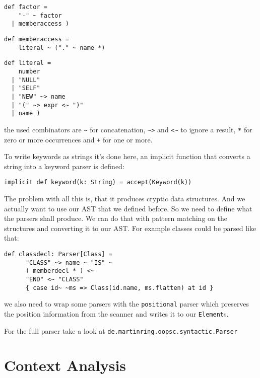 \documentclass{style}
\begin{document}
\begin{lstlisting}[name=parser]
def factor = 
    "-" ~ factor                                        
  | memberaccess )
\end{lstlisting}
\begin{lstlisting}[name=parser]
def memberaccess =
    literal ~ ("." ~ name *)                            
\end{lstlisting}
\begin{lstlisting}[name=parser]
def literal = 
    number                                              
  | "NULL"                                              
  | "SELF"                                              
  | "NEW" ~> name                                       
  | "(" ~> expr <~ ")"
  | name ) 
\end{lstlisting}

the used combinators are \texttt{\textasciitilde} for concatenation, \texttt{\textasciitilde >} and \texttt{<\textasciitilde} to ignore a result, \texttt{*} for zero or more occurrences and \texttt{+} for one or more.

To write keywords as strings it's done here, an implicit function that converts a string into a keyword parser is defined:

\begin{lstlisting}[name=parser]
implicit def keyword(k: String) = accept(Keyword(k))
\end{lstlisting}

The problem with all this is, that it produces cryptic data structures. And we actually want to use our AST that we defined before. So we need to define what the parsers shall produce. We can do that with pattern matching on the structures and converting it to our AST. For example classes could be parsed like that:

\begin{lstlisting}[name=parser]
  def classdecl: Parser[Class] =
      "CLASS" ~> name ~ "IS" ~
      ( memberdecl * ) <~
      "END" <~ "CLASS"                                    
      { case id~ ~ms => Class(id.name, ms.flatten) at id }
\end{lstlisting}

we also need to wrap some parsers with the \texttt{positional} parser which preserves the position information from the scanner and writes it to our \texttt{Element}s.

For the full parser take a look at \texttt{de.martinring.oopsc.syntactic.Parser}

\section{Context Analysis}
\end{document}
